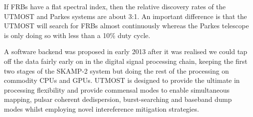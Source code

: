 If FRBs have a flat spectral index, then the relative discovery rates of the UTMOST and Parkes systems are about 3:1. An important difference is that the UTMOST will search for FRBs almost continuously whereas the Parkes telescope is only doing so with less than a 10\% duty cycle.

A software backend was proposed in early 2013 after it was realised we could tap off the data fairly early on in the digital signal processing chain, keeping the first two stages of the SKAMP-2 system but doing the rest of the processing on commodity CPUs and GPUs. UTMOST is designed to provide the ultimate in processing flexibility and provide commensal modes to enable simultaneous mapping, pulsar coherent dedispersion, burst-searching and baseband dump modes whilst employing novel intereference mitigation strategies.





